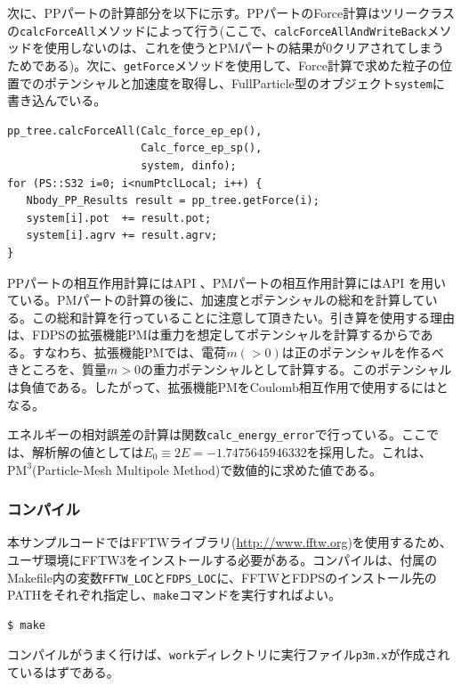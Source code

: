 次に、PPパートの計算部分を以下に示す。PPパートのForce計算はツリークラスの\texttt{calcForceAll}メソッドによって行う(ここで、\texttt{calcForceAllAndWriteBack}メソッドを使用しないのは、これを使うとPMパートの結果が0クリアされてしまうためである)。次に、\texttt{getForce}メソッドを使用して、Force計算で求めた粒子の位置でのポテンシャルと加速度を取得し、FullParticle型のオブジェクト\texttt{system}に書き込んでいる。
\begin{lstlisting}[caption=PPパートの計算]
pp_tree.calcForceAll(Calc_force_ep_ep(),
                     Calc_force_ep_sp(),
                     system, dinfo);
for (PS::S32 i=0; i<numPtclLocal; i++) {
   Nbody_PP_Results result = pp_tree.getForce(i);
   system[i].pot  += result.pot;
   system[i].agrv += result.agrv;
}
\end{lstlisting}
\endifCpp

\ifIF
PPパートの相互作用計算にはAPI 、PMパートの相互作用計算にはAPI を用いている。PMパートの計算の後に、加速度とポテンシャルの総和を計算している。この総和計算を\textbf{}行っていることに注意して頂きたい。引き算を使用する理由は、FDPSの拡張機能PMは重力を想定してポテンシャルを計算するからである。すなわち、拡張機能PMでは、電荷$m(>0)$は正のポテンシャルを作るべきところを、質量$m>0$の重力ポテンシャルとして計算する。このポテンシャルは負値である。したがって、拡張機能PMをCoulomb相互作用で使用するには\textbf{}となる。
\endifIF


エネルギーの相対誤差の計算は関数\texttt{calc\_energy\_error}で行っている。ここでは、解析解の値としては$E_{0}\equiv 2E =-1.7475645946332$を採用した。これは、$\mathrm{PM^{3}}$(Particle-Mesh Multipole Method)で数値的に求めた値である。

\subsubsection{コンパイル}
本サンプルコードではFFTWライブラリ(\url{http://www.fftw.org})を使用するため、ユーザ環境にFFTW3をインストールする必要がある。コンパイルは、付属のMakefile内の変数\texttt{FFTW\_LOC}と\texttt{FDPS\_LOC}に、FFTWとFDPSのインストール先のPATHをそれぞれ指定し、\texttt{make}コマンドを実行すればよい。
\begin{screen}
\begin{verbatim}
$ make
\end{verbatim}
\end{screen}
コンパイルがうまく行けば、\texttt{work}ディレクトリに実行ファイル\texttt{p3m.x}が作成されているはずである。

